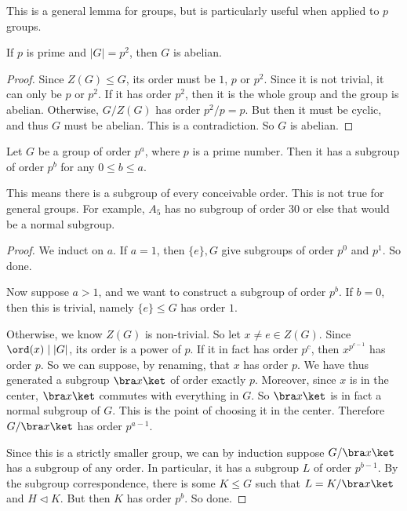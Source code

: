 \documentclass[a4paper]{article}
\begin{document}
This is a general lemma for groups, but is particularly useful when applied to $p$ groups.
\begin{cor}
  If $p$ is prime and $|G| = p^2$, then $G$ is abelian.
\end{cor}

\begin{proof}
  Since $Z(G) \leq G$, its order must be $1$, $p$ or $p^2$. Since it is not trivial, it can only be $p$ or $p^2$. If it has order $p^2$, then it is the whole group and the group is abelian. Otherwise, $G/Z(G)$ has order $p^2/p = p$. But then it must be cyclic, and thus $G$ must be abelian. This is a contradiction. So $G$ is abelian.
\end{proof}

\begin{thm}
  Let $G$ be a group of order $p^a$, where $p$ is a prime number. Then it has a subgroup of order $p^b$ for any $0 \leq b \leq a$.
\end{thm}
This means there is a subgroup of every conceivable order. This is not true for general groups. For example, $A_5$ has no subgroup of order $30$ or else that would be a normal subgroup.

\begin{proof}
  We induct on $a$. If $a = 1$, then $\{e\}, G$ give subgroups of order $p^0$ and $p^1$. So done.

  Now suppose $a > 1$, and we want to construct a subgroup of order $p^b$. If $b = 0$, then this is trivial, namely $\{e\} \leq G$ has order $1$.

  Otherwise, we know $Z(G)$ is non-trivial. So let $x \not= e \in Z(G)$. Since $\ord(x) \mid |G|$, its order is a power of $p$. If it in fact has order $p^c$, then $x^{p^{c - 1}}$ has order $p$. So we can suppose, by renaming, that $x$ has order $p$. We have thus generated a subgroup $\bra x\ket$ of order exactly $p$. Moreover, since $x$ is in the center, $\bra x\ket$ commutes with everything in $G$. So $\bra x\ket$ is in fact a normal subgroup of $G$. This is the point of choosing it in the center. Therefore $G/\bra x\ket$ has order $p^{a - 1}$.

  Since this is a strictly smaller group, we can by induction suppose $G/\bra x\ket$ has a subgroup of any order. In particular, it has a subgroup $L$ of order $p^{b - 1}$. By the subgroup correspondence, there is some $K \leq G$ such that $L = K / \bra x\ket$ and $H \lhd K$. But then $K$ has order $p^b$. So done.
\end{proof}
\end{document}
